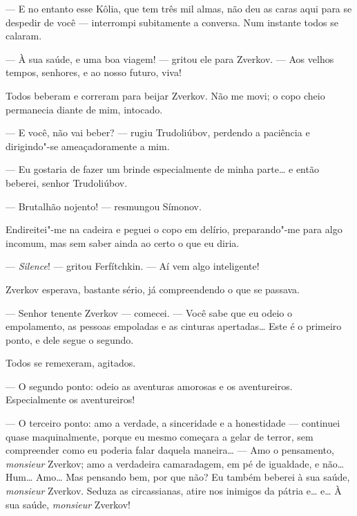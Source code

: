 --- E no entanto esse Kôlia, que tem três mil almas, não deu as caras aqui
para se despedir de você --- interrompi subitamente a conversa. Num
instante todos se calaram.



--- À sua saúde, e uma boa viagem! --- gritou ele para Zverkov. --- Aos velhos
tempos, senhores, e ao nosso futuro, viva!

Todos beberam e correram para beijar Zverkov. Não me movi; o copo cheio
permanecia diante de mim, intocado.

--- E você, não vai beber? --- rugiu Trudoliúbov, perdendo a paciência e
dirigindo"-se ameaçadoramente a mim.

--- Eu gostaria de fazer um brinde especialmente de minha parte\ldots{} e então
beberei, senhor Trudoliúbov.

--- Brutalhão nojento! --- resmungou Símonov.

Endireitei"-me na cadeira e peguei o copo em delírio, preparando"-me para
algo incomum, mas sem saber ainda ao certo o que eu diria.

--- \textit{Silence}! --- gritou Ferfítchkin. --- Aí vem algo inteligente!

Zverkov esperava, bastante sério, já compreendendo o que se passava.

--- Senhor tenente Zverkov --- comecei. --- Você sabe que eu odeio o
empolamento, as pessoas empoladas e as cinturas apertadas\ldots{} Este é o
primeiro ponto, e dele segue o segundo.

Todos se remexeram, agitados.

--- O segundo ponto: odeio as aventuras amorosas e os aventureiros.
Especialmente os aventureiros!

--- O terceiro ponto: amo a verdade, a sinceridade e a honestidade ---
continuei quase maquinalmente, porque eu mesmo começara a gelar de
terror, sem compreender como eu poderia falar daquela maneira\ldots{} --- Amo
o pensamento, \textit{monsieur} Zverkov; amo a verdadeira camaradagem,
em pé de igualdade, e não\ldots{} Hum\ldots{} Amo\ldots{} Mas pensando bem, por que
não? Eu também beberei à sua saúde, \textit{monsieur} Zverkov. Seduza
as circassianas, atire nos inimigos da pátria e\ldots{} e\ldots{} À sua saúde,
\textit{monsieur} Zverkov!

